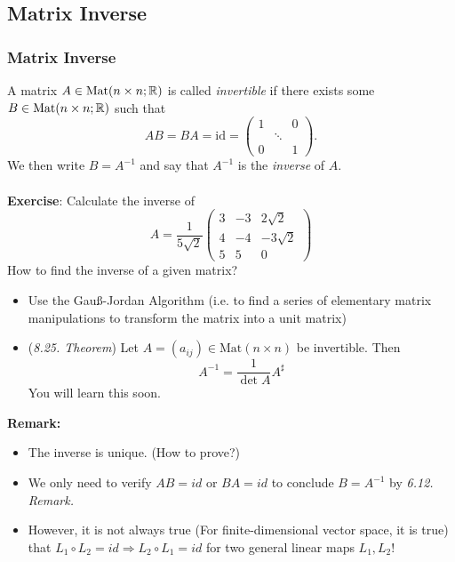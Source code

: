 \documentclass[12pt, t]{beamer}
\renewcommand{\emph}[1]{{\color{Turquoise3}\textsl{#1}}}
\newcommand{\nullspace}{~\\[15pt]}
\newcommand{\remark}{\textbf{Remark: }}
\begin{document}
\subsection{Matrix Inverse}
\begin{frame}[allowframebreaks]
    \frametitle{Matrix Inverse}
    A matrix $A\in\text{Mat}(n\times n;\mathbb{R})$ is called \emph{invertible} if there exists some $B\in\text{Mat}(n\times n;\mathbb{R})$ such that
    \begin{equation}\label{eq19}
        AB=BA=\text{id}=\begin{pmatrix}
            1 &        & 0 \\
              & \ddots &   \\
            0 &        & 1
        \end{pmatrix}.
    \end{equation}
    We then write $B=A^{-1}$ and say that $A^{-1}$ is the \emph{inverse} of $A$.\\
    \nullspace\textbf{Exercise}:
    Calculate the inverse of
    \[
        A=\frac{1}{5 \sqrt{2}}\left(\begin{array}{ccc}
                3 & -3 & 2 \sqrt{2}  \\
                4 & -4 & -3 \sqrt{2} \\
                5 & 5  & 0
            \end{array}\right)
    \]
    \newpage
    How to find the inverse of a given matrix?
    \begin{itemize}
        \item Use the Gau\ss-Jordan Algorithm (i.e. to find a series of elementary matrix manipulations to transform the matrix into a unit matrix)
        \item (\textit{8.25. Theorem}) Let $A=(a_{ij})\in\text{Mat}(n\times n)$ be invertible. Then
              \[A^{-1}=\frac{1}{\det A}A^{\sharp}\]
              You will learn this soon.
    \end{itemize}
    \remark
    \begin{itemize}
        \item The inverse is unique. (How to prove?)
        \item We only need to verify $AB=id$ or $BA=id$ to conclude $B=A^{-1}$ by \textit{6.12. Remark.}
        \item However, it is not always true (For finite-dimensional vector space, it is true) that $L_1\circ L_2=id\Rightarrow L_2\circ L_1=id$ for two general linear maps $L_1,L_2$!
    \end{itemize}
\end{frame}
\end{document}
